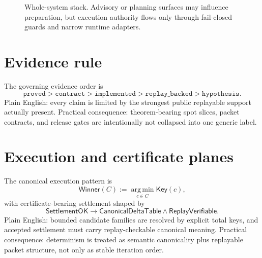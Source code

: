\documentclass[9pt]{extarticle}
\newcommand{\Key}{\mathsf{Key}}
\newcommand{\Winner}{\mathsf{Winner}}
\newcommand{\argmin}{\operatorname*{arg\,min}}
\begin{document}
\begin{figure}[t]
\centering
{}
\caption{Whole-system stack. Advisory or planning surfaces may influence preparation, but execution authority flows only through fail-closed guards and narrow runtime adapters.}
\end{figure}

\section{Evidence rule}
The governing evidence order is
\[
\mathtt{proved} > \mathtt{contract} > \mathtt{implemented} > \mathtt{replay\_backed} > \mathtt{hypothesis}.
\]
Plain English: every claim is limited by the strongest public replayable
support actually present.
Practical consequence: theorem-bearing spot slices, packet contracts, and
release gates are intentionally not collapsed into one generic label.

\section{Execution and certificate planes}
The canonical execution pattern is
\[
\Winner(C) := \argmin_{c \in C} \Key(c),
\]
with certificate-bearing settlement shaped by
\[
\mathsf{SettlementOK} \to \mathsf{CanonicalDeltaTable} \wedge \mathsf{ReplayVerifiable}.
\]
Plain English: bounded candidate families are resolved by explicit total
keys, and accepted settlement must carry replay-checkable canonical meaning.
Practical consequence: determinism is treated as semantic canonicality plus
replayable packet structure, not only as stable iteration order.
\end{document}
